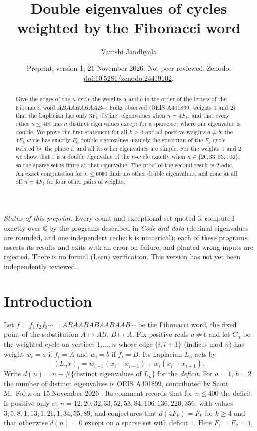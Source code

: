 \documentclass[11pt]{amsart}
\title[Double eigenvalues of Fibonacci-weighted cycles]{Double eigenvalues of cycles weighted by the Fibonacci word}
\author{Vamshi Jandhyala}
\date{Preprint, version 1, 21 November 2026. Not peer reviewed. Zenodo: \href{https://doi.org/10.5281/zenodo.24419102}{doi:10.5281/zenodo.24419102}.}
\theoremstyle{definition}
\newcommand{\Q}{\mathbb{Q}}
\begin{document}
\begin{abstract}
Give the edges of the $n$-cycle the weights $a$ and $b$ in the order of the letters of the Fibonacci word
$ABAABABAAB\cdots$. Foltz observed (OEIS A401899, weights $1$ and $2$) that the Laplacian has only $3F_k$
distinct eigenvalues when $n=4F_k$, and that every other $n\le 400$ has $n$ distinct eigenvalues except for
a sparse set where one eigenvalue is double. We prove the first statement for all $k\ge4$ and all positive
weights $a\ne b$: the $4F_k$-cycle has exactly $F_k$ double eigenvalues, namely the spectrum of the
$F_k$-cycle twisted by the phase $i$, and all its other eigenvalues are simple. For the weights $1$ and $2$
we show that $1$ is a double eigenvalue of the $n$-cycle exactly when $n\in\{20,33,53,106\}$, so the sparse
set is finite at that eigenvalue. The proof of the second result is $2$-adic. An exact computation for
$n\le 6000$ finds no other double eigenvalues, and none at all off $n=4F_k$ for four other pairs of weights.
\end{abstract}

\maketitle

\noindent\emph{Status of this preprint.} Every count and exceptional set quoted is computed exactly over $\Q$
by the programs described in \emph{Code and data} (decimal eigenvalues are rounded, and one independent recheck is
numerical); each of these programs asserts its results and exits with an error on
failure, and planted wrong inputs are rejected. There is no formal (Lean) verification. This version has not yet been independently
reviewed.

\section{Introduction}

Let $f=f_1f_2f_3\cdots=ABAABABAABAAB\cdots$ be the Fibonacci word, the fixed point of the substitution
$A\mapsto AB$, $B\mapsto A$. Fix positive reals $a\ne b$ and let $C_n$ be the weighted cycle on vertices
$1,\dots,n$ whose edge $\{i,i+1\}$ (indices mod $n$) has weight $w_i=a$ if $f_i=A$ and $w_i=b$ if $f_i=B$.
Its Laplacian $L_n$ acts by
\[
(L_nx)_i=w_{i-1}(x_i-x_{i-1})+w_i(x_i-x_{i+1}).
\]
Write $d(n)=n-\#\{\text{distinct eigenvalues of }L_n\}$ for the \emph{deficit}. For $a=1$, $b=2$ the number of
distinct eigenvalues is OEIS A401899, contributed by Scott M.~Foltz on 15 November 2026 \cite{OEIS}. Its
comment records that for $n\le400$ the deficit is positive only at
$n=12,20,32,33,52,53,84,106,136,220,356$, with values $3,5,8,1,13,1,21,1,34,55,89$, and conjectures that
$d(4F_k)=F_k$ for $k\ge4$ and that otherwise $d(n)=0$ except on a sparse set with deficit $1$.
Here $F_1=F_2=1$.
\end{document}
